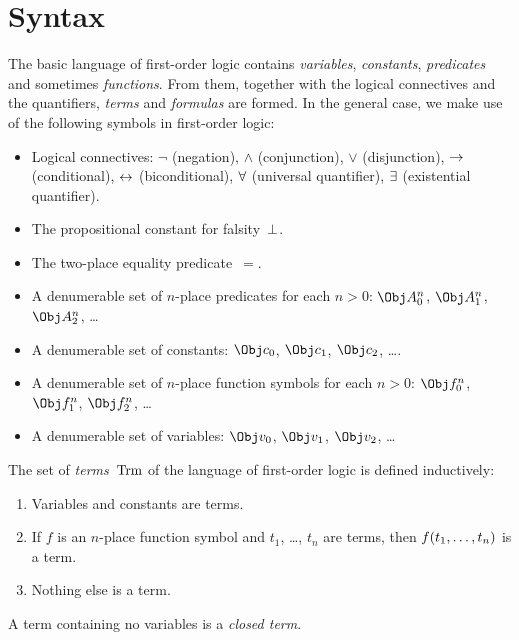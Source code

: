 \documentclass[syntax-and-semantics]{subfiles}
\begin{document}
\section{Syntax}


The basic language of first-order logic contains \emph{variables}, \emph{constants}, \emph{predicates} and sometimes \emph{functions}.  From them, together with the logical connectives and the quantifiers, \emph{terms} and \emph{formulas} are formed.  In the general case, we make use of the following symbols in first-order logic:

\begin{itemize}
\item Logical connectives: $\lnot$ (negation), $\land$ (conjunction), $\lor$ (disjunction), $\to$ (conditional), $\leftrightarrow$ (biconditional), $\lforall$ (universal quantifier), $\lexists$ (existential quantifier).
\item The propositional constant for falsity~$\bot$.
\item The two-place equality predicate~$=$.
\item A denumerable set of $n$-place predicates for each $n>0$: $\Obj A^n_0$, $\Obj A^n_1$, $\Obj A^n_2$, \dots
\item A denumerable set of constants: $\Obj c_0$, $\Obj c_1$, $\Obj c_2$, \dots.
\item A denumerable set of $n$-place function symbols for each $n>0$: $\Obj f^n_0$, $\Obj f^n_1$, $\Obj f^n_2$, \dots
\item A denumerable set of variables: $\Obj v_0$, $\Obj v_1$, $\Obj v_2$, \dots
\end{itemize}



\begin{defn}[Term]
The set of \emph{terms}~$\Trm$ of the language of first-order logic is
defined inductively:
\begin{enumerate}
\item Variables and constants are terms.
\item If $f$ is an $n$-place function symbol and $t_1$, \dots, $t_n$
  are terms, then ${ f(t_1, \ldots, t_n) }$ is a term.
\item Nothing else is a term.
\end{enumerate}
A term containing no variables is a \emph{closed term}.
\end{defn}
\end{document}
